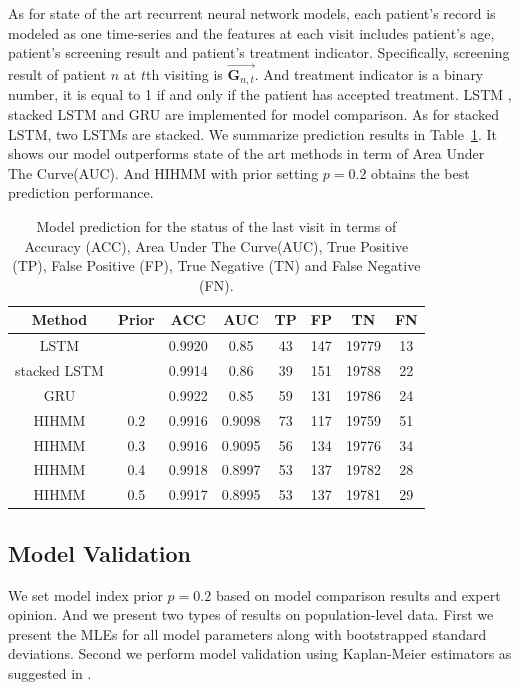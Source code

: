 \documentclass{article}
\begin{document}
As for state of the art recurrent neural network models, each patient's record is modeled as one time-series and the features at each visit includes patient's age, patient's screening result and patient's treatment indicator. Specifically, screening result of patient $n$ at $t$th visiting is $\vec{\bm G_{n,t}}$. And treatment indicator is a binary number, it is equal to 1 if and only if the patient has accepted treatment. LSTM \citep{Cho_2014}, stacked LSTM \citep{Dyer_2015} and GRU \citep{Chung_2014} are implemented for model comparison. As for stacked LSTM, two LSTMs are stacked. We summarize prediction results in Table~\ref{Model_Comparison}. It shows our model outperforms state of the art methods in term of Area Under The Curve(AUC). And HIHMM with prior setting $p = 0.2$ obtains the best prediction performance.

\begin{table}[ht!]
	\centering
	\caption{Model prediction for the status of the last visit in terms of Accuracy (ACC), Area Under The Curve(AUC), True Positive (TP), False Positive (FP), True Negative (TN) and False Negative (FN).}
	\begin{tabular}{|c|c|c|c|c|c|c|c|}
		\hline
		Method & Prior & ACC & AUC & TP & FP & TN & FN \\
		\hline
		LSTM &  & 0.9920 & 0.85 & 43 & 147 & 19779 & 13 \\
		\hline
		stacked LSTM &  & 0.9914 & 0.86 & 39 & 151 & 19788 & 22 \\
		\hline
		GRU &  & 0.9922 & 0.85 & 59 & 131 & 19786 & 24 \\
		\hline
		HIHMM & 0.2 & 0.9916 & 0.9098 & 73 & 117 & 19759 & 51 \\
		\hline
		HIHMM & 0.3 & 0.9916 & 0.9095 & 56 & 134 & 19776 & 34 \\
		\hline
		HIHMM & 0.4 & 0.9918 & 0.8997 & 53 & 137 & 19782 & 28 \\
		\hline
		HIHMM & 0.5 & 0.9917 & 0.8995 & 53 & 137 & 19781 & 29 \\
		\hline
	\end{tabular}
	\label{Model_Comparison}
\end{table}




\subsection{Model Validation}
We set model index prior $p = 0.2$ based on model comparison results and expert opinion. And we present two types of results on population-level data. First we present the MLEs for all model parameters along with bootstrapped standard deviations. Second we perform model validation using Kaplan-Meier estimators as suggested in \cite{titman_general_2008}.
\end{document}
